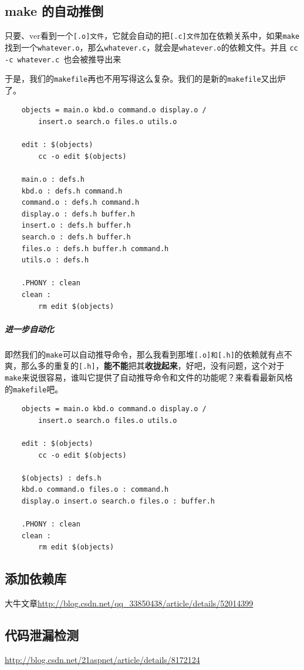 \documentclass[UTF8,a4paper,12pt]{ctexbook} %
\begin{document}
		\subsection{make 的自动推倒}
			只要、ver看到一个\verb|[.o]文件|，它就会自动的把\verb|[.c]文件|加在依赖关系中，如果\verb|make|找到一个\verb|whatever.o|，那么\verb|whatever.c|，就会是\verb|whatever.o|的依赖文件。并且 \verb|cc -c whatever.c |也会被推导出来
			
			于是，我们的\verb|makefile|再也不用写得这么复杂。我们的是新的\verb|makefile|又出炉了。
			\begin{lstlisting}
	objects = main.o kbd.o command.o display.o /
		insert.o search.o files.o utils.o
		
	edit : $(objects)
		cc -o edit $(objects)
		
	main.o : defs.h
	kbd.o : defs.h command.h
	command.o : defs.h command.h
	display.o : defs.h buffer.h
	insert.o : defs.h buffer.h
	search.o : defs.h buffer.h
	files.o : defs.h buffer.h command.h
	utils.o : defs.h
	
	.PHONY : clean
	clean :
		rm edit $(objects)
			\end{lstlisting}
			
			\subparagraph{进一步自动化}即然我们的\verb|make|可以自动推导命令，那么我看到那堆\verb|[.o]和[.h]|的依赖就有点不爽，那么多的重复的\verb|[.h]|，\textbf{能不能}把其\textbf{收拢起来}，好吧，没有问题，这个对于\verb|make|来说很容易，谁叫它提供了自动推导命令和文件的功能呢？来看看最新风格的\verb|makefile|吧。
			
				\begin{lstlisting}
	objects = main.o kbd.o command.o display.o /
		insert.o search.o files.o utils.o
		
	edit : $(objects)
		cc -o edit $(objects)
		
	$(objects) : defs.h
	kbd.o command.o files.o : command.h
	display.o insert.o search.o files.o : buffer.h
	
	.PHONY : clean
	clean :
		rm edit $(objects)
				\end{lstlisting}
		\subsection{添加依赖库}
		
			大牛文章\url{http://blog.csdn.net/qq_33850438/article/details/52014399}	
		\subsection{代码泄漏检测}
			\url{http://blog.csdn.net/21aspnet/article/details/8172124}
			
\end{document}
